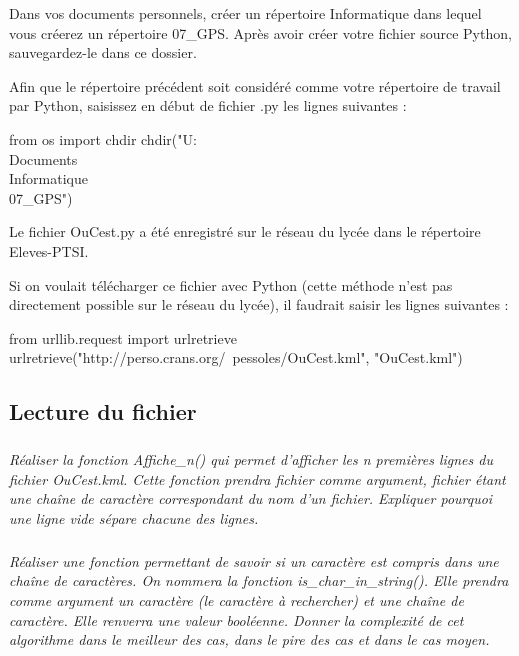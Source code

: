 \documentclass[10pt,oneside]{article}
\begin{document}
\begin{py}
Dans vos documents personnels, créer un répertoire \textsf{Informatique} dans lequel vous créerez un répertoire \textsf{07\_GPS}. Après avoir créer votre fichier source Python, sauvegardez-le dans ce dossier. 

Afin que le répertoire précédent soit considéré comme votre répertoire de travail par Python, saisissez en début de fichier .py les lignes suivantes :

\begin{python}
from os import chdir
chdir("U:\\Documents\\Informatique\\07_GPS")
\end{python}

 Le fichier \textsf{OuCest.py} a été enregistré sur le réseau du lycée dans le répertoire Eleves-PTSI. 

Si on voulait télécharger ce fichier avec Python (cette méthode n'est pas directement possible sur le réseau du lycée), il faudrait saisir les lignes suivantes :

\begin{python}
from urllib.request import urlretrieve
urlretrieve("http://perso.crans.org/~pessoles/OuCest.kml", "OuCest.kml")
\end{python}


\end{py}



\subsection{Lecture du fichier}

\subparagraph{}
\textit{Réaliser la fonction \textsf{Affiche\_n()} qui permet d'afficher les n premières lignes du fichier \textsf{OuCest.kml}. Cette fonction prendra \textsf{fichier} comme argument, \textsf{fichier} étant une chaîne de caractère correspondant du nom d'un fichier. 
Expliquer pourquoi une ligne vide sépare chacune des lignes.}


\subparagraph{}
\textit{Réaliser une fonction permettant de savoir si un caractère est compris dans une chaîne de caractères. On nommera la fonction \textsf{is\_char\_in\_string()}. Elle prendra comme argument un caractère (le caractère à rechercher) et une chaîne de caractère. Elle renverra une valeur booléenne. Donner la complexité de cet algorithme dans le meilleur des cas, dans le pire des cas et dans le cas moyen.}
\end{document}
